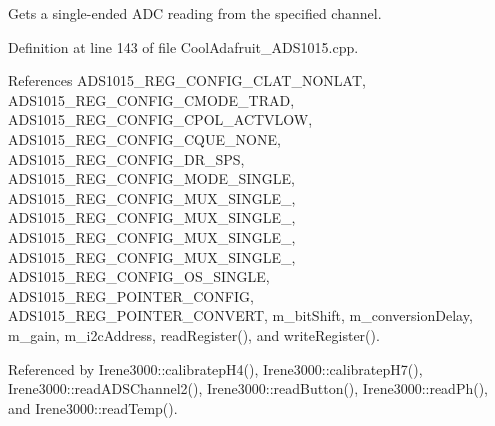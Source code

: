 Gets a single-\/ended A\+DC reading from the specified channel. 



Definition at line 143 of file Cool\+Adafruit\+\_\+\+A\+D\+S1015.\+cpp.



References A\+D\+S1015\+\_\+\+R\+E\+G\+\_\+\+C\+O\+N\+F\+I\+G\+\_\+\+C\+L\+A\+T\+\_\+\+N\+O\+N\+L\+AT, A\+D\+S1015\+\_\+\+R\+E\+G\+\_\+\+C\+O\+N\+F\+I\+G\+\_\+\+C\+M\+O\+D\+E\+\_\+\+T\+R\+AD, A\+D\+S1015\+\_\+\+R\+E\+G\+\_\+\+C\+O\+N\+F\+I\+G\+\_\+\+C\+P\+O\+L\+\_\+\+A\+C\+T\+V\+L\+OW, A\+D\+S1015\+\_\+\+R\+E\+G\+\_\+\+C\+O\+N\+F\+I\+G\+\_\+\+C\+Q\+U\+E\+\_\+\+N\+O\+NE, A\+D\+S1015\+\_\+\+R\+E\+G\+\_\+\+C\+O\+N\+F\+I\+G\+\_\+\+D\+R\+\_\+S\+PS, A\+D\+S1015\+\_\+\+R\+E\+G\+\_\+\+C\+O\+N\+F\+I\+G\+\_\+\+M\+O\+D\+E\+\_\+\+S\+I\+N\+G\+LE, A\+D\+S1015\+\_\+\+R\+E\+G\+\_\+\+C\+O\+N\+F\+I\+G\+\_\+\+M\+U\+X\+\_\+\+S\+I\+N\+G\+L\+E\+\_, A\+D\+S1015\+\_\+\+R\+E\+G\+\_\+\+C\+O\+N\+F\+I\+G\+\_\+\+M\+U\+X\+\_\+\+S\+I\+N\+G\+L\+E\+\_, A\+D\+S1015\+\_\+\+R\+E\+G\+\_\+\+C\+O\+N\+F\+I\+G\+\_\+\+M\+U\+X\+\_\+\+S\+I\+N\+G\+L\+E\+\_, A\+D\+S1015\+\_\+\+R\+E\+G\+\_\+\+C\+O\+N\+F\+I\+G\+\_\+\+M\+U\+X\+\_\+\+S\+I\+N\+G\+L\+E\+\_, A\+D\+S1015\+\_\+\+R\+E\+G\+\_\+\+C\+O\+N\+F\+I\+G\+\_\+\+O\+S\+\_\+\+S\+I\+N\+G\+LE, A\+D\+S1015\+\_\+\+R\+E\+G\+\_\+\+P\+O\+I\+N\+T\+E\+R\+\_\+\+C\+O\+N\+F\+IG, A\+D\+S1015\+\_\+\+R\+E\+G\+\_\+\+P\+O\+I\+N\+T\+E\+R\+\_\+\+C\+O\+N\+V\+E\+RT, m\+\_\+bit\+Shift, m\+\_\+conversion\+Delay, m\+\_\+gain, m\+\_\+i2c\+Address, read\+Register(), and write\+Register().



Referenced by Irene3000\+::calibratep\+H4(), Irene3000\+::calibratep\+H7(), Irene3000\+::read\+A\+D\+S\+Channel2(), Irene3000\+::read\+Button(), Irene3000\+::read\+Ph(), and Irene3000\+::read\+Temp().


